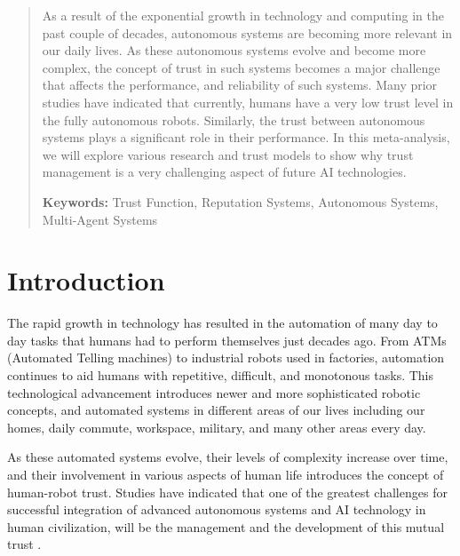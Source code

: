 \documentclass[runningheads,a4paper]{llncs}
\begin{document}
\maketitle
\begin{abstract}

\noindent As a result of the exponential growth in technology and computing in the past couple of decades, autonomous systems are becoming more relevant in our daily lives. As these autonomous systems evolve and become more complex, the concept of trust in such systems becomes a major challenge that affects the performance, and reliability of such systems. Many prior studies have indicated that currently, humans have a very low trust level in the fully autonomous robots. Similarly, the trust between autonomous systems plays a significant role in their performance. In this meta-analysis, we will explore various research and trust models to show why trust management is a very challenging aspect of future AI technologies.

\vspace{10pt}
\textbf{Keywords:} Trust Function, Reputation Systems, Autonomous Systems, Multi-Agent Systems
\end{abstract}


\section{Introduction} 
\label{ShervinTrustSurvey_introduction}
The rapid growth in technology has resulted in the automation of many day to day tasks that humans had to perform themselves just decades ago. From ATMs (Automated Telling machines) to industrial robots used in factories, automation continues to aid humans with repetitive, difficult, and monotonous tasks. This technological advancement introduces newer and more sophisticated robotic concepts, and automated systems in different areas of our lives including our homes, daily commute, workspace, military, and many other areas every day.

As these automated systems evolve, their levels of complexity increase over time, and their involvement in various aspects of human life introduces the concept of human-robot trust. Studies have indicated that one of the greatest challenges for successful integration of advanced autonomous systems and AI technology in human civilization, will be the management and the development of this mutual trust \cite{beer2014toward}.
\end{document}
